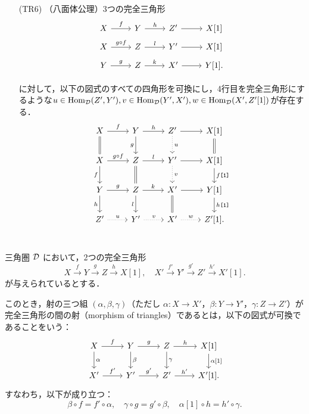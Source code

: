 \begin{defn}
\begin{itemize}
	\item[(TR6)]
		（八面体公理）3つの完全三角形\\
			\[
				\begin{tikzcd}[row sep=5pt]
			X \ar[r,"f"]& Y\ar[r,"h"]& Z' \ar[r]& X[1]\\
			X \ar[r,"g\circ f"]& Z\ar[r,"l"]& Y' \ar[r]& X[1]\\
			Y \ar[r,"g"]& Z\ar[r,"k"]& X' \ar[r]& Y[1].\\
		\end{tikzcd}
			\]
			に対して，以下の図式のすべての四角形を可換にし，4行目を完全三角形にするような$u\in\operatorname{\mathrm{Hom}}_{{\mathcal D}}(Z',Y'),v\in\operatorname{\mathrm{Hom}}_{{\mathcal D}}(Y',X'),w\in\operatorname{\mathrm{Hom}}_{{\mathcal D}}(X',Z'[1])$が存在する．
			\[
		\begin{tikzcd}
			X \ar[r,"f"]\ar[d,equal]& Y\ar[r,"h"]\ar[d,"g",swap]& Z'\ar[d,"u",dotted] \ar[r]& X[1]\ar[d,equal]\\
			X \ar[r,"g\circ f"]\ar[d,"f",swap]& Z\ar[r,"l"]\ar[d,equal]& Y'\ar[d,"v",dotted] \ar[r]& X[1]\ar[d,"f\texttt{[1]}"]\\
			Y \ar[r,"g"]\ar[d,"h",swap]& Z\ar[r,"k"]\ar[d,"l",swap]& X' \ar[r]\ar[d,equal]& Y[1]\ar[d,"h\texttt{[1]}"]\\
			Z' \ar[r,"u",dotted]& Y'\ar[r,"v",dotted]& X' \ar[r,"w",dotted]& Z'[1].\\
		\end{tikzcd}
			\]
	\end{itemize}
\end{defn}

\begin{defn}\cite[p.243]{KS06}
三角圏 ${\mathcal D}$ において，2つの完全三角形
\[
X \xrightarrow{f} Y \xrightarrow{g} Z \xrightarrow{h} X[1], \quad
X' \xrightarrow{f'} Y' \xrightarrow{g'} Z' \xrightarrow{h'} X'[1].
\]
が与えられているとする．

このとき，射の三つ組 $(\alpha, \beta, \gamma)$（ただし $\alpha \colon X \to X'$，$\beta \colon Y \to Y'$，$\gamma \colon Z \to Z'$）が完全三角形の間の射（morphism of triangles）であるとは，以下の図式が可換であることをいう：
\[
\begin{tikzcd}
X \arrow{r}{f} \arrow{d}{\alpha} & Y \arrow{r}{g} \arrow{d}{\beta} & Z \arrow{r}{h} \arrow{d}{\gamma} & X[1] \arrow{d}{\alpha[1]} \\
X' \arrow{r}{f'} & Y' \arrow{r}{g'} & Z' \arrow{r}{h'} & X'[1].
\end{tikzcd}
\]
すなわち，以下が成り立つ：
\[
\beta \circ f = f' \circ \alpha, \quad
\gamma \circ g = g' \circ \beta, \quad
\alpha[1] \circ h = h' \circ \gamma.
\]
\end{defn}
